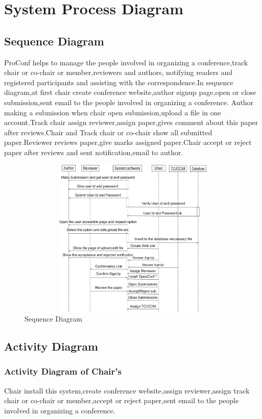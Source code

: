 
\chapter{System Process Diagram}




\section{Sequence Diagram}
ProConf helps to manage the people involved in organizing a conference,track chair or co-chair or member,reviewers and authors, notifying readers and registered participants and assisting with the correspondence.In sequence diagram,at first chair create conference website,author signup page,open or close submission,sent email to the people involved in organizing a conference. Author making a submission when chair open submission,upload a file in one account.Track chair assign reviewer,assign paper,gives comment about this paper after reviews.Chair and Track chair or co-chair show all submitted paper.Reviewer reviews paper,give marks assigned paper.Chair accept or reject paper after reviews and sent  notification,email to author.

\begin{figure}[h!]
\centering
  \includegraphics[width=6in,height=3in]{pic/seq1}
   \caption{Sequence Diagram}\label{sequence}
\end{figure}


\section{Activity Diagram}
\subsection{Activity Diagram of Chair’s}
Chair install this system,create conference website,assign reviewer,assign track chair or co-chair or member,accept or reject paper,sent email to the people involved in organizing a conference.

